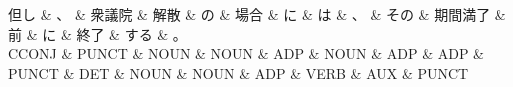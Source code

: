 \documentclass[tikz,border=5pt]{standalone}
\begin{document}
\normalsize
\begin{dependency}[edge unit distance=12.0pt]
    \begin{deptext}[column sep=1em]
        但し \& 、 \& 衆議院 \& 解散 \& の \& 場合 \& に \& は \& 、 \& その \& 期間満了 \& 前 \& に \& 終了 \& する \& 。\\
        CCONJ \& PUNCT \& NOUN \& NOUN \& ADP \& NOUN \& ADP \& ADP \& PUNCT \& DET \& NOUN \& NOUN \& ADP \& VERB \& AUX \& PUNCT\\
    \end{deptext}
\end{dependency}
\end{document}
